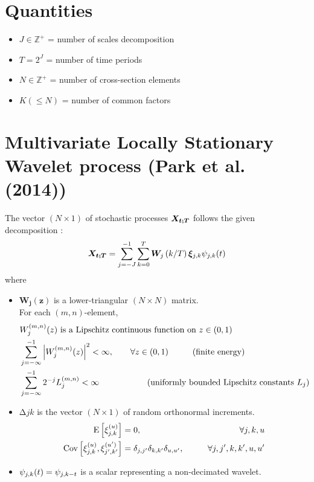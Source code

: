 \documentclass[main_document.tex]{subfiles}
\begin{document}
\section{Quantities}
	\begin{itemize}
		\item $J \in \mathbb{Z}^{+}$ = number of scales decomposition
		\item $T = 2^{J}$ = number of time periods 
		\item $N \in \mathbb{Z}^{+}$ = number of cross-section elements
		\item $K (\leq N)$ = number of common factors
	\end{itemize}

\section{Multivariate Locally Stationary Wavelet process (Park et al. (2014))}
	The vector $(N \times 1)$ of stochastic processes $\X{t}$ follows the given decomposition : 
	\begin{align}\label{eq:lswStructure}
		 \X{t} = \scalesum{j} \locsum{k} \W{j}{k} \increment{j}{k} \wavelet{j}{k}{t} 
	\end{align}
	where 
	\begin{itemize}
		\item $\bm{W_{j}(z)}$ is a lower-triangular $(N \times N)$ matrix. \\ 
			For each $(m,n)$-element, 
			\begin{align}
				 &W_{j}^{(m,n)}(z) \text{ is a Lipschitz continuous function on } z \in (0,1) \\
				 &\sum_{j=-\infty}^{-1} \abs{W_{j}^{(m,n)}(z)}^{2} < \infty, \qquad \forall z \in (0,1) \hspace{1cm} \text{(finite energy)}\\
				 &\sum_{j=-\infty}^{-1} 2^{-j}L_{j}^{(m,n)} < \infty  \hspace{2cm} \text{(uniformly bounded Lipschitz constants $L_{j}$)}
			\end{align}
		\item $\increment{j}{k}$ is the vector $(N \times 1)$ of random orthonormal increments.
			\begin{align}
				\E{\eincrement{u}{j}{k}} &= 0, \qquad &\forall j,k,u \\ \label{eq:indepIncrements}
				\Cov{\eincrement{u}{j}{k}}{\eincrement{u'}{j'}{k'}} &= \kronecker{j}{j'}\kronecker{k}{k'}\kronecker{u}{u'}, \qquad &\forall j,j',k,k',u,u' 
			\end{align}

		\item $\wavelet{j}{k}{t} = \psi_{j,k-t}$ is a scalar representing a non-decimated wavelet.
	\end{itemize}
\end{document}
